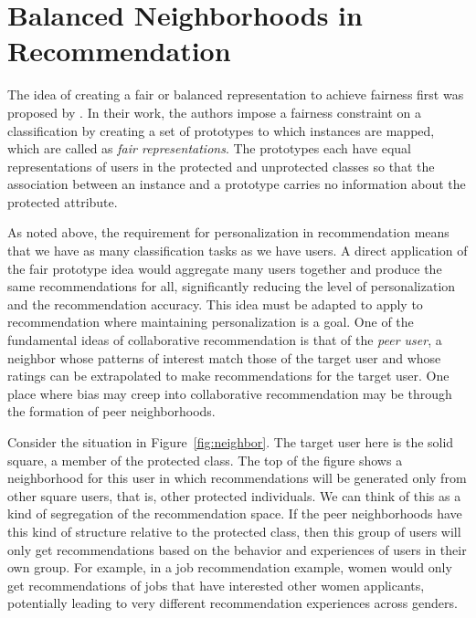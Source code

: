 

\section{Balanced Neighborhoods in Recommendation}

The idea of creating a fair or balanced representation to achieve fairness first was proposed by \cite{zemel2013learning}. In their work, the authors impose a fairness constraint on a classification by creating a set of prototypes to which instances are mapped, which are called as \textit{fair representations}. The prototypes each have equal representations of users in the protected and unprotected classes so that the association between an instance and a prototype carries no information about the protected attribute. 

As noted above, the requirement for personalization in recommendation means that we have as many classification tasks as we have users. A direct application of the fair prototype idea would aggregate many users together and produce the same recommendations for all, significantly reducing the level of personalization and the recommendation accuracy. This idea must be adapted to apply to recommendation where maintaining personalization is a goal. One of the fundamental ideas of collaborative recommendation is that of the \textit{peer user}, a neighbor whose patterns of interest match those of the target user and whose ratings can be extrapolated to make recommendations for the target user. One place where bias may creep into collaborative recommendation may be through the formation of peer neighborhoods.

Consider the situation in Figure~\ref{fig:neighbor}. The target user here is the solid square, a member of the protected class. The top of the figure shows a neighborhood for this user in which recommendations will be generated only from other square users, that is, other protected individuals. We can think of this as a kind of segregation of the recommendation space. If the peer neighborhoods have this kind of structure relative to the protected class, then this group of users will only get recommendations based on the behavior and experiences of users in their own group. For example, in a job recommendation example, women would only get recommendations of jobs that have interested other women applicants, potentially leading to very different recommendation experiences across genders. 

